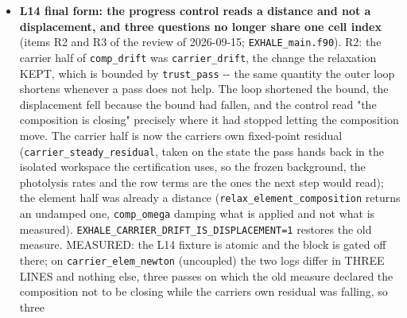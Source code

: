\documentclass[english,a4paper]{my_memo}
\begin{document}
\begin{itemize}
  \texttt{-\/-reservoir\ \textless{}El\textgreater{}/H\ \textless{}value\textgreater{}} arguments the mapper takes -\/- with
  \texttt{run\_case.sh} calling the command for a profile case and passing every
  option it prints, and \texttt{element\_flux\_closure.py}, which had grown its own
  copy of the same rule, importing it and computing nothing of its own.
  Verified: the command on the pre-L21 state of
  \texttt{atomic\_photochem\_gj1132x0.10\_kzzprofile/HeH9.7} against its new column
  prints four options (C/H, He/H, N/H, O/H), the mapped seed then carries all
  four at the profile\textquotesingle s values, and all six cases load and enter the solver;
  the nine closure rungs are unaffected, the routine being the one they were
  already using, moved. The \texttt{grid} refactor is behaviour-preserving: rebuilding
  the L13 reproduction seed through the moved helpers gives data rows
  byte-identical to the pair the earlier run loaded, the only difference being
  the target path the \texttt{\#\ mapped:} provenance line records.
\item
  \textbf{L14 final form: the progress control reads a distance and not a
  displacement, and three questions no longer share one cell index} (items R2
  and R3 of the review of 2026-09-15; \texttt{EXHALE\_main.f90}). R2: the carrier half
  of \texttt{comp\_drift} was \texttt{carrier\_drift}, the change the relaxation KEPT, which is
  bounded by \texttt{trust\_pass} -\/- the same quantity the outer loop shortens whenever
  a pass does not help. The loop shortened the bound, the displacement fell
  because the bound had fallen, and the control read "the composition is
  closing" precisely where it had stopped letting the composition move. The
  carrier half is now the carrier\textquotesingle s own fixed-point residual
  (\texttt{carrier\_steady\_residual}, taken on the state the pass hands back in the
  isolated workspace the certification uses, so the frozen background, the
  photolysis rates and the row terms are the ones the next step would read);
  the element half was already a distance
  (\texttt{relax\_element\_composition} returns an undamped one, \texttt{comp\_omega} damping
  what is applied and not what is measured).
  \texttt{EXHALE\_CARRIER\_DRIFT\_IS\_DISPLACEMENT=1} restores the old measure. MEASURED:
  the L14 fixture is atomic and the block is gated off there; on
  \texttt{carrier\_elem\_newton} (uncoupled) the two logs differ in THREE LINES and
  nothing else, three passes on which the old measure declared the composition
  not to be closing while the carrier\textquotesingle s own residual was falling, so three

\end{itemize}
\end{document}
